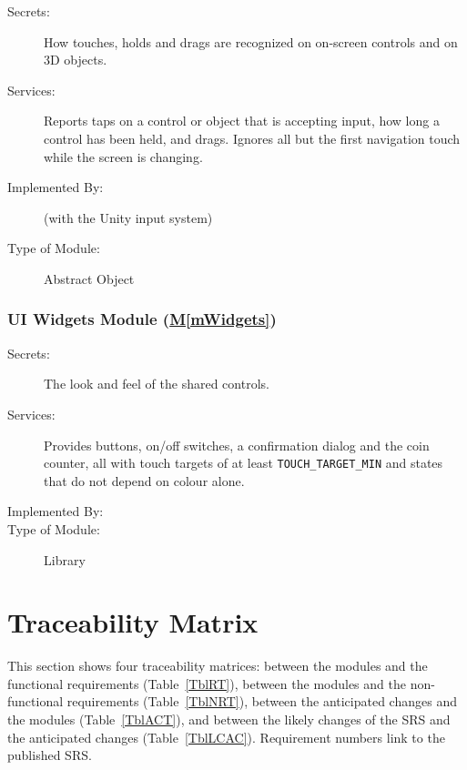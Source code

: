 \documentclass[12pt, titlepage]{article}
\newcommand{\mref}[1]{\hyperref[#1]{M\ref*{#1}}}
\begin{document}
\begin{description}
\item[Secrets:] How touches, holds and drags are recognized on on-screen
  controls and on 3D objects.
\item[Services:] Reports taps on a control or object that is accepting input,
  how long a control has been held, and drags. Ignores all but the first
  navigation touch while the screen is changing.
\item[Implemented By:] \progname{} (with the Unity input system)
\item[Type of Module:] Abstract Object
\end{description}

\subsubsection{UI Widgets Module (\mref{mWidgets})}

\begin{description}
\item[Secrets:] The look and feel of the shared controls.
\item[Services:] Provides buttons, on/off switches, a confirmation dialog and
  the coin counter, all with touch targets of at least
  \texttt{TOUCH\_TARGET\_MIN} and states that do not depend on colour alone.
\item[Implemented By:] \progname{}
\item[Type of Module:] Library
\end{description}

\section{Traceability Matrix} \label{SecTM}

This section shows four traceability matrices: between the modules and the
functional requirements (Table~\ref{TblRT}), between the modules and the
non-functional requirements (Table~\ref{TblNRT}), between the anticipated
changes and the modules (Table~\ref{TblACT}), and between the likely changes of
the SRS and the anticipated changes (Table~\ref{TblLCAC}). Requirement numbers
link to the published SRS.
\end{document}
